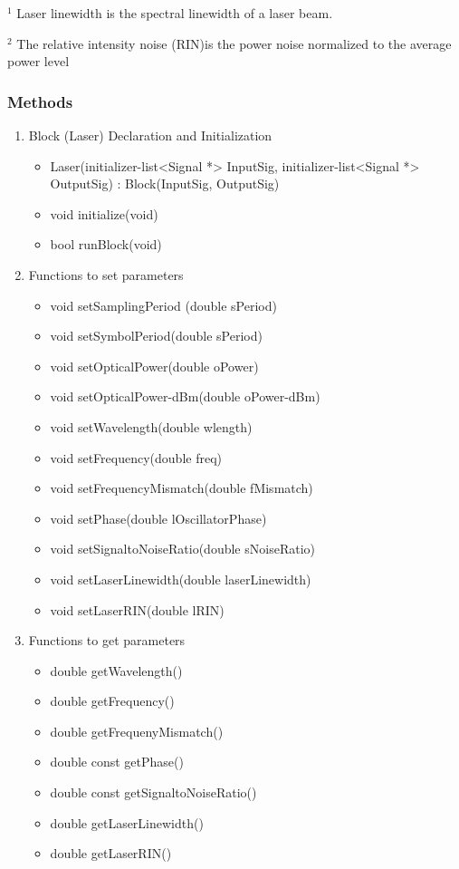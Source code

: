 $^1$ Laser linewidth is the spectral linewidth of a laser beam.
\par
$^2$ The relative intensity noise (RIN)is the power noise normalized to the average power level



\subsubsection*{Methods}


    \begin{enumerate}
         \item Block (Laser) Declaration and Initialization
             \begin{itemize}
             \item Laser(initializer-list<Signal *> InputSig, initializer-list<Signal *> OutputSig) : Block(InputSig, OutputSig){}
             \item void initialize(void)
             \item bool runBlock(void)
             \end{itemize}
         \item Functions to set parameters
         \begin{itemize}
             \item void setSamplingPeriod (double sPeriod)
             \item void setSymbolPeriod(double sPeriod)
             \item void setOpticalPower(double oPower)
             \item void setOpticalPower-dBm(double oPower-dBm)
             \item void setWavelength(double wlength)
             \item void setFrequency(double freq)
             \item void setFrequencyMismatch(double fMismatch)
             \item void setPhase(double lOscillatorPhase)
             \item void setSignaltoNoiseRatio(double sNoiseRatio)
             \item void setLaserLinewidth(double laserLinewidth)
             \item void setLaserRIN(double lRIN)
         \end{itemize}
         \item Functions to get parameters
         \begin{itemize}
            \item double getWavelength()
            \item double getFrequency()
            \item double getFrequenyMismatch()
            \item double const getPhase()
            \item double const getSignaltoNoiseRatio()
            \item double getLaserLinewidth()
            \item double getLaserRIN()
         \end{itemize}
     \end{enumerate}
\newpage
